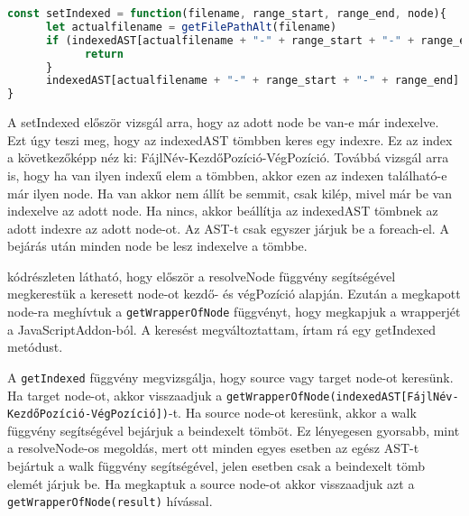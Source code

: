 \begin{lstlisting}[caption={setIndexed metódus}, label={lst:setIndexed_function}, language={JavaScript}]
const setIndexed = function(filename, range_start, range_end, node){
      let actualfilename = getFilePathAlt(filename)
      if (indexedAST[actualfilename + "-" + range_start + "-" + range_end] !== undefined && indexedAST[actualfilename + "-" + range_start + "-" + range_end] !== node){
            return
      }
      indexedAST[actualfilename + "-" + range_start + "-" + range_end] = node
}
\end{lstlisting}

A setIndexed először vizsgál arra, hogy az adott node be van-e már indexelve.
Ezt úgy teszi meg, hogy az indexedAST tömbben keres egy indexre.
Ez az index a következőképp néz ki: FájlNév-KezdőPozíció-VégPozíció.
Továbbá vizsgál arra is, hogy ha van ilyen indexű elem a tömbben, akkor ezen az indexen található-e már ilyen node.
Ha van akkor nem állít be semmit, csak kilép, mivel már be van indexelve az adott node. Ha nincs, akkor beállítja az indexedAST tömbnek az adott indexre az adott node-ot.
Az AST-t csak egyszer járjuk be a foreach-el. A bejárás után minden node be lesz indexelve a tömbbe.

\noindent

 kódrészleten látható, hogy először a resolveNode függvény segítségével megkerestük a keresett node-ot kezdő- és végPozíció alapján.
Ezután a megkapott node-ra meghívtuk a \texttt{getWrapperOfNode} függvényt, hogy megkapjuk a wrapperjét a JavaScriptAddon-ból.
A keresést megváltoztattam, írtam rá egy getIndexed metódust.

\noindent
{}
A \texttt{getIndexed} függvény megvizsgálja, hogy source vagy target node-ot keresünk.
Ha target node-ot, akkor visszaadjuk a \texttt{getWrapperOfNode(indexedAST[FájlNév-KezdőPozíció-VégPozíció])}-t.
Ha source node-ot keresünk, akkor a walk függvény segítségével bejárjuk a beindexelt tömböt.
Ez lényegesen gyorsabb, mint a resolveNode-os megoldás, mert ott minden egyes esetben az egész AST-t bejártuk a walk függvény segítségével, jelen esetben csak a beindexelt tömb elemét járjuk be.
Ha megkaptuk a source node-ot akkor visszaadjuk azt a \texttt{getWrapperOfNode(result)} hívással.
